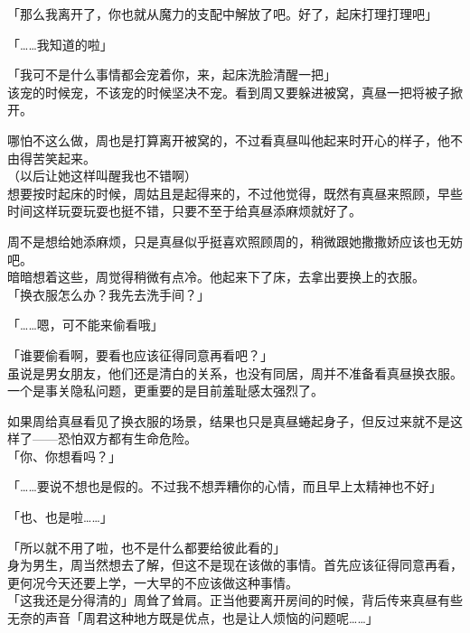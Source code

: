 「那么我离开了，你也就从魔力的支配中解放了吧。好了，起床打理打理吧」

「……我知道的啦」

「我可不是什么事情都会宠着你，来，起床洗脸清醒一把」\\

该宠的时候宠，不该宠的时候坚决不宠。看到周又要躲进被窝，真昼一把将被子掀开。

哪怕不这么做，周也是打算离开被窝的，不过看真昼叫他起来时开心的样子，他不由得苦笑起来。\\

（以后让她这样叫醒我也不错啊）\\

想要按时起床的时候，周姑且是起得来的，不过他觉得，既然有真昼来照顾，早些时间这样玩耍玩耍也挺不错，只要不至于给真昼添麻烦就好了。

周不是想给她添麻烦，只是真昼似乎挺喜欢照顾周的，稍微跟她撒撒娇应该也无妨吧。\\

暗暗想着这些，周觉得稍微有点冷。他起来下了床，去拿出要换上的衣服。\\

「换衣服怎么办？我先去洗手间？」

「……嗯，可不能来偷看哦」

「谁要偷看啊，要看也应该征得同意再看吧？」\\

虽说是男女朋友，他们还是清白的关系，也没有同居，周并不准备看真昼换衣服。一个是事关隐私问题，更重要的是目前羞耻感太强烈了。

如果周给真昼看见了换衣服的场景，结果也只是真昼蜷起身子，但反过来就不是这样了——恐怕双方都有生命危险。\\

「你、你想看吗？」

「……要说不想也是假的。不过我不想弄糟你的心情，而且早上太精神也不好」

「也、也是啦……」

「所以就不用了啦，也不是什么都要给彼此看的」\\

身为男生，周当然想去了解，但这不是现在该做的事情。首先应该征得同意再看，更何况今天还要上学，一大早的不应该做这种事情。\\

「这我还是分得清的」周耸了耸肩。正当他要离开房间的时候，背后传来真昼有些无奈的声音「周君这种地方既是优点，也是让人烦恼的问题呢……」\\

\vspace{2\baselineskip}

